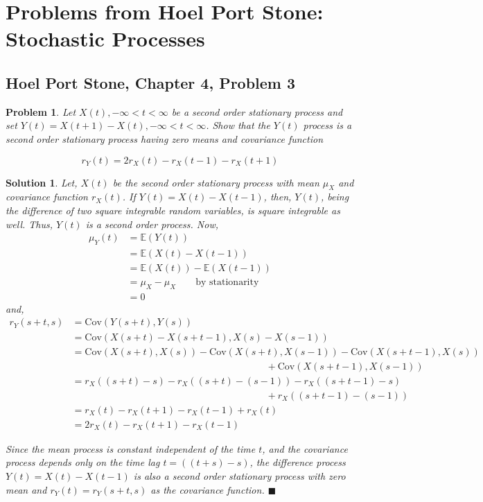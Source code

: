 \documentclass[12pt]{article}
\theoremstyle{problemstyle}
\newtheorem{pbm}{Problem}
\newtheorem*{solution*}{Solution}
\newenvironment{problem}{
\begin{tcolorbox}[colback=green!10!white,colframe=black!75!black, parbox = false]\begin{pbm} }{\end{pbm}\end{tcolorbox} }
\newcommand{\E}{\mathbb{E}}
\newcommand{\Cov}{\text{Cov}}
\begin{document}
\newpage


\section{Problems from Hoel Port Stone: Stochastic Processes}


\subsection{Hoel Port Stone, Chapter 4, Problem 3}
\begin{problem}
Let $X(t), -\infty < t < \infty$ be a second order stationary process and set $Y(t) = X(t+1) - X(t), -\infty < t < \infty$. Show that the $Y(t)$ process is a second order stationary process having zero means and covariance function

$$
r_Y(t) = 2r_X(t) - r_X(t-1) - r_X(t+1)
$$
\end{problem}
\begin{solution*}
Let, $X(t)$ be the second order stationary process with mean $\mu_X$ and covariance function $r_X(t)$. If $Y(t) = X(t) - X(t-1)$, then, $Y(t)$, being the difference of two square integrable random variables, is square integrable as well. Thus, $Y(t)$ is a second order process. Now, 
\begin{align*}
    \mu_Y(t) 
    & = \E(Y(t))\\
    & = \E(X(t) - X(t-1))\\
    & = \E(X(t)) - \E(X(t-1))\\
    & = \mu_X - \mu_X \qquad \text{by stationarity}\\
    & = 0
\end{align*}
\noindent and,
\begin{align*}
    r_Y(s+t, s)
    & = \Cov(Y(s+t), Y(s))\\
    & = \Cov(X(s+t) - X(s+t-1), X(s) - X(s-1))\\
    & = \Cov(X(s+t), X(s)) - \Cov(X(s+t), X(s-1)) - \Cov(X(s+t-1), X(s))\\
    & \qquad \qquad \qquad \qquad \qquad \qquad \qquad \qquad \qquad \qquad + \Cov(X(s+t-1), X(s-1))\\
    & = r_X((s+t) - s) - r_X((s+t) - (s-1)) - r_X((s+t-1) - s)\\
    & \qquad \qquad \qquad \qquad \qquad \qquad \qquad \qquad \qquad \qquad + r_X((s+t-1) - (s-1))\\
    & = r_X(t) - r_X(t+1) - r_X(t-1) + r_X(t)\\
    & = 2 r_X(t) - r_X(t+1) - r_X(t-1)
\end{align*}

\noindent Since the mean process is constant independent of the time $t$, and the covariance process depends only on the time lag $t = ((t+s) - s)$, the difference process $Y(t) = X(t) - X(t-1)$ is also a second order stationary process with zero mean and $r_Y(t) = r_Y(s+t, s)$ as the covariance function. \hfill $\blacksquare$

\end{solution*}
\end{document}
